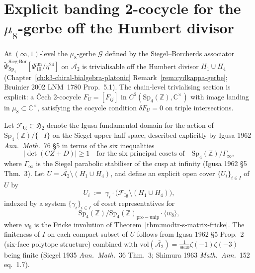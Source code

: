 \section{Explicit banding 2-cocycle for the \texorpdfstring{$\mu_8$}{mu-8}-gerbe off the Humbert divisor}
\label{sec:modtr-banding-cocycle}

At $(\infty,1)$-level the $\mu_8$-gerbe $\mathcal G$ defined by the
Siegel--Borcherds associator
$\widetilde\Phi^{\mathrm{Sieg\text{-}Bor}}_{\mathrm{Sp}_4}[\Phi_{10}^{\mathrm{un}}/\eta^{24}]$
on $\overline{\mathcal A_2}$ is trivialisable off the Humbert divisor
$H_1\cup H_4$ (Chapter~\ref{ch:k3-chiral-bialgebra-platonic}
Remark~\ref{rem:cydkappa-gerbe}; Bruinier 2002 LNM~1780
Prop.~5.1). The chain-level trivialising section is explicit: a
\v{C}ech 2-cocycle $F_U = [F_{ij}]$ in
$C^2(\mathrm{Sp}_4(\mathbb Z), \mathbb C^\times)$ with image landing in
$\mu_8\subset\mathbb C^\times$, satisfying the cocycle condition
$\delta F_U = 0$ on triple intersections.

\begin{definition}
\label{def:modtr-igusa-cover}
Let $\mathcal F_{\mathrm{Ig}}\subset\mathfrak H_2$ denote the Igusa
fundamental domain for the action of $\mathrm{Sp}_4(\mathbb Z)/\{\pm I\}$
on the Siegel upper half-space, described explicitly by Igusa 1962
\emph{Ann.\ Math.}~76 \S5 in terms of the six inequalities
\[
 |\det(C Z + D)|\geq 1
 \quad\text{for the six principal cosets of}\quad
 \mathrm{Sp}_4(\mathbb Z)/\Gamma_{\infty},
\]
where $\Gamma_{\infty}$ is the Siegel parabolic stabiliser of the cusp
at infinity (Igusa 1962 \S5 Thm.~3). Let
$U = \overline{\mathcal A_2}\setminus(H_1\cup H_4)$, and define an
explicit open cover $\{U_i\}_{i\in I}$ of $U$ by
\[
 U_i \;:=\; \gamma_i\cdot\bigl(\mathcal F_{\mathrm{Ig}}\setminus
 (H_1\cup H_4)\bigr),
\]
indexed by a system $\{\gamma_i\}_{i\in I}$ of coset representatives for
\[
 \mathrm{Sp}_4(\mathbb Z)/\mathrm{Sp}_4(\mathbb Z)_{\mathrm{pro-unip}}
 \cdot\langle w_8\rangle,
\]
where $w_8$ is the Fricke involution of
Theorem~\ref{thm:modtr-s-matrix-fricke}. The finiteness of
$I$ on each compact subset of $U$ follows from Igusa 1962 \S5 Prop.~2
(six-face polytope structure) combined with
$\mathrm{vol}(\overline{\mathcal A_2}) = \tfrac{1}{8640}\zeta(-1)\zeta(-3)$
being finite (Siegel 1935 \emph{Ann.\ Math.}~36 Thm.~3; Shimura 1963
\emph{Math.\ Ann.}~152 eq.~1.7).
\end{definition}


